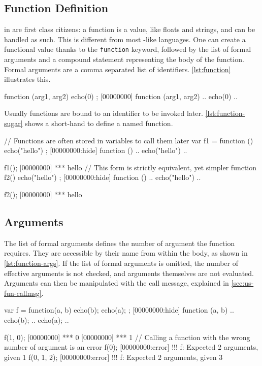 \subsection{Function Definition}

 in \us are first class citizens: a function is a
value, like floats and strings, and can be handled as such.  This is
different from most \C-like languages.  One can create a functional
value thanks to the \lstinline|function| keyword, followed by the list
of formal arguments and a compound statement representing the body of
the function. Formal arguments are a comma separated list of
identifiers. \autoref{lst:function} illustrates this.

\begin{urbiscript}[caption=Functional value,label=lst:function,float=\floatpos]
function (arg1, arg2) { echo(0) };
[00000000] function (arg1, arg2) {
..  echo(0)
..}
\end{urbiscript}

Usually functions are bound to an identifier to be invoked later.
\autoref{lst:function-sugar} shows a short-hand to define a named
function.

\begin{urbiscript}[caption=Storing functions in variables,
  label=lst:function-sugar,float=\floatpos]
// Functions are often stored in variables to call them later
var f1 = function () {
  echo("hello")
};
[00000000:hide] function () {
..  echo("hello")
..}

f1();
[00000000] *** hello
// This form is strictly equivalent, yet simpler
function f2()
{
  echo("hello")
};
[00000000:hide] function () {
..  echo("hello")
..}

f2();
[00000000] *** hello
\end{urbiscript}


\subsection{Arguments}

The list of formal arguments defines the number of argument the
function requires. They are accessible by their name from within the
body, as shown in \autoref{lst:function-args}.  If the list of formal
arguments is omitted, the number of effective arguments is not
checked, and arguments themselves are not evaluated. Arguments can
then be manipulated with the call message, explained in
\autoref{sec:us-fun-callmsg}.

\begin{urbiscript}[caption=Storing and calling
  functions,label=lst:function-args,float=\floatpos]
var f = function(a, b) {
  echo(b);
  echo(a);
};
[00000000:hide] function (a, b) {
..  echo(b);
..  echo(a);
..}

f(1, 0);
[00000000] *** 0
[00000000] *** 1
// Calling a function with the wrong number of argument is an error
f(0);
[00000000:error] !!! f: Expected 2 arguments, given 1
f(0, 1, 2);
[00000000:error] !!! f: Expected 2 arguments, given 3
\end{urbiscript}

